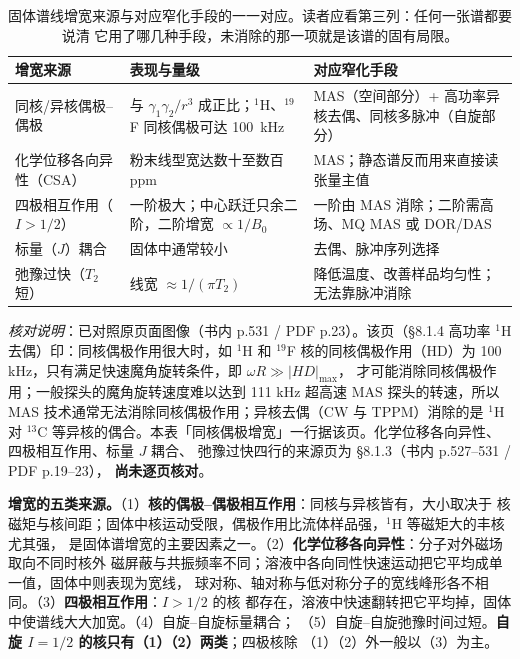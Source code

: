 \begin{table}[htbp]
\centering
\caption{固体谱线增宽来源与对应窄化手段的一一对应。读者应看第三列：任何一张谱都要说清
它用了哪几种手段，未消除的那一项就是该谱的固有局限。}
\label{tab:narrow-map}
{\srcsize
\begin{tabularx}{\columnwidth}{@{}lXX@{}}
\toprule
增宽来源 & 表现与量级 & 对应窄化手段 \\
\midrule
同核/异核偶极--偶极 & 与 $\gamma_1\gamma_2/r^3$ 成正比；$^{1}$H、$^{19}$F 同核偶极可达 \qty{100}{kHz} & MAS（空间部分）+ 高功率异核去偶、同核多脉冲（自旋部分） \\
化学位移各向异性（CSA） & 粉末线型宽达数十至数百 ppm & MAS；静态谱反而用来直接读张量主值 \\
四极相互作用（$I>1/2$） & 一阶极大；中心跃迁只余二阶，二阶增宽 $\propto 1/B_0$ & 一阶由 MAS 消除；二阶需高场、MQ MAS 或 DOR/DAS \\
标量（$J$）耦合 & 固体中通常较小 & 去偶、脉冲序列选择 \\
弛豫过快（$T_2$ 短） & 线宽 $\approx 1/(\pi T_2)$ & 降低温度、改善样品均匀性；无法靠脉冲消除 \\
\bottomrule
\end{tabularx}}
\end{table}
\emph{核对说明}：已对照原页面图像（书内 p.531 / PDF p.23）。该页（§8.1.4 高功率
$^{1}$H 去偶）印：同核偶极作用很大时，如 $^{1}$H 和 $^{19}$F 核的同核偶极作用（HD）为
100 kHz，只有满足快速魔角旋转条件，即 $\omega R \gg |HD|_{\max}$，
才可能消除同核偶极作用；一般探头的魔角旋转速度难以达到 111 kHz 超高速 MAS 探头的转速，所以 MAS
技术通常无法消除同核偶极作用；异核去偶（CW 与 TPPM）消除的是 $^{1}$H 对 $^{13}$C
等异核的偶合。本表「同核偶极增宽」一行据该页。化学位移各向异性、四极相互作用、标量 $J$ 耦合、
弛豫过快四行的来源页为 §8.1.3（书内 p.527--531 / PDF p.19--23），
\textbf{尚未逐页核对}。

\begin{principle}
\textbf{增宽的五类来源。}（1）\textbf{核的偶极--偶极相互作用}：同核与异核皆有，大小取决于
核磁矩与核间距；固体中核运动受限，偶极作用比流体样品强，$^{1}$H 等磁矩大的丰核尤其强，
是固体谱增宽的主要因素之一。（2）\textbf{化学位移各向异性}：分子对外磁场取向不同时核外
磁屏蔽与共振频率不同；溶液中各向同性快速运动把它平均成单一值，固体中则表现为宽线，
球对称、轴对称与低对称分子的宽线峰形各不相同。（3）\textbf{四极相互作用}：$I>1/2$ 的核
都存在，溶液中快速翻转把它平均掉，固体中使谱线大大加宽。（4）自旋--自旋标量耦合；
（5）自旋--自旋弛豫时间过短。\textbf{自旋 $I=1/2$ 的核只有（1）（2）两类}；四极核除
（1）（2）外一般以（3）为主。
\end{principle}

